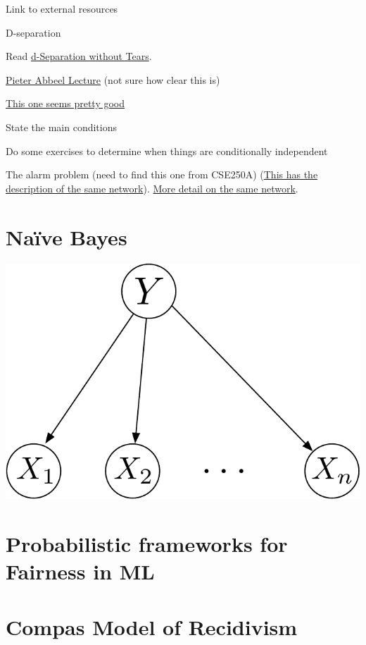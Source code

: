 \documentclass[assignment02_Solutions]{subfiles}
\begin{document}
\bi
\item Link to external resources
\item D-separation
\begin{externalresources}
\bi
\item Read \href{http://bayes.cs.ucla.edu/BOOK-09/ch11-1-2-final.pdf}{d-Separation without Tears}.
\item \href{https://www.youtube.com/watch?v=yDs_q6jKHb0}{Pieter Abbeel Lecture} (not sure how clear this is)
\item \href{https://www.youtube.com/watch?v=IjoWqnH6HmU}{This one seems pretty good}
\ei
\end{externalresources}
\item State the main conditions
\item Do some exercises to determine when things are conditionally independent
\ei

\begin{exercise}
The alarm problem (need to find this one from CSE250A) (\href{http://aima.eecs.berkeley.edu/slides-pdf/chapter14a.pdf}{This has the description of the same network}).  \href{https://people.cs.pitt.edu/~milos/courses/cs2740/Lectures/class19.pdf}{More detail on the same network}.
\end{exercise}

\section{Na\"ive Bayes}
\begin{marginfigure}
\includegraphics[width=\linewidth]{figures/naivebayesgm}
\end{marginfigure}

\section{Probabilistic frameworks for Fairness in ML}

\section{Compas Model of Recidivism}
\end{document}
